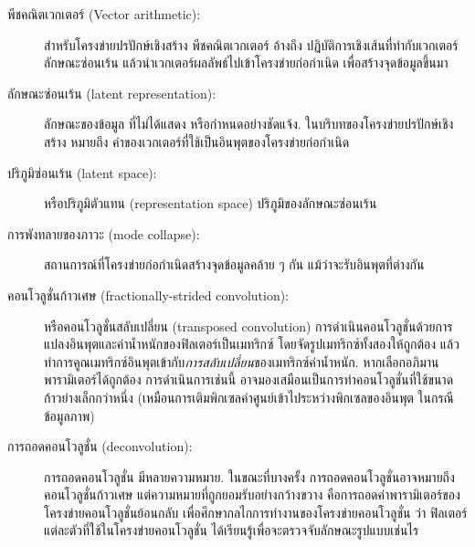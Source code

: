 \begin{description}
\item[พีชคณิตเวกเตอร์ (Vector arithmetic):]
สำหรับโครงข่ายปรปักษ์เชิงสร้าง 
พีชคณิตเวกเตอร์ อ้างถึง ปฏิบัติการเชิงเส้นที่ทำกับเวกเตอร์ลักษณะซ่อนเร้น แล้วนำเวกเตอร์ผลลัพธ์ไปเข้าโครงข่ายก่อกำเนิด เพื่อสร้างจุดข้อมูลขึ้นมา

\item[ลักษณะซ่อนเร้น (latent representation):]
ลักษณะของข้อมูล ที่ไม่ได้แสดง หรือกำหนดอย่างชัดแจ้ง.
ในบริบทของโครงข่ายปรปักษ์เชิงสร้าง หมายถึง ค่าของเวกเตอร์ที่ใช้เป็นอินพุตของโครงข่ายก่อกำเนิด

\item[ปริภูมิซ่อนเร้น (latent space):] หรือปริภูมิตัวแทน (representation space)
ปริภูมิของลักษณะซ่อนเร้น

\item[การพังทลายของภาวะ (mode collapse):]
สถานการณ์ที่โครงข่ายก่อกำเนิดสร้างจุดข้อมูลคล้าย ๆ กัน แม้ว่าจะรับอินพุตที่ต่างกัน


\item[คอนโวลูชั่นก้าวเศษ (fractionally-strided convolution):] หรือคอนโวลูชั่นสลับเปลี่ยน (transposed convolution)
การดำเนินคอนโวลูชั่นด้วยการแปลงอินพุตและค่าน้ำหนักของฟิลเตอร์เป็นเมทริกซ์ โดยจัดรูปเมทริกซ์ทั้งสองให้ถูกต้อง 
แล้วทำการคูณเมทริกซ์อินพุตเข้ากับ\textit{การสลับเปลี่ยน}ของเมทริกซ์ค่าน้ำหนัก.
หากเลือกอภิมานพารามิเตอร์ได้ถูกต้อง การดำเนินการเช่นนี้ อาจมองเสมือนเป็นการทำคอนโวลูชั่นที่ใช้ขนาดก้าวย่างเล็กกว่าหนึ่ง (เหมือนการเติมพิกเซลค่าศูนย์เข้าไประหว่างพิกเซลของอินพุต ในกรณีข้อมูลภาพ)


\item[การถอดคอนโวลูชั่น (deconvolution):]
การถอดคอนโวลูชั่น มีหลายความหมาย.
ในขณะที่บางครั้ง การถอดคอนโวลูชั่นอาจหมายถึงคอนโวลูชั่นก้าวเศษ
แต่ความหมายที่ถูกยอมรับอย่างกว้างขวาง  คือการถอดค่าพารามิเตอร์ของโครงข่ายคอนโวลูชั่นย้อนกลับ 
เพื่อศึกษากลไกการทำงานของโครงข่ายคอนโวลูชั่น ว่า
ฟิลเตอร์แต่ละตัวที่ใช้ในโครงข่ายคอนโวลูชั่น 
ได้เรียนรู้เพื่อจะตรวจจับลักษณะรูปแบบเช่นไร






\end{description}
